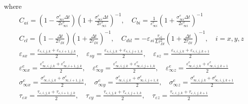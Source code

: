 \documentclass[pdftex,a4paper,parskip,listof=totoc,bibliography=totoc,onehalfspacing,12pt]{scrreprt}
\begin{document}
where
\begin{align*}
  &C_{ai} = \left( 1 - \frac{\sigma^e_{\infty i} \Delta t}{2 \varepsilon^e_{\infty i}} \right) \left( 1 + \frac{\sigma^e_{\infty i} \Delta t}{2 \varepsilon^e_{\infty i}} \right)^{-1}, \quad
  C_{bi} = \frac{1}{\varepsilon^e_{\infty i}} \left( 1 + \frac{\sigma^e_{\infty i} \Delta t}{2 \varepsilon^e_{\infty i}} \right)^{-1}\\
  &C_{c l} = \left( 1 - \frac{ \Delta t}{2 \tau_{Dl}} \right) \left( 1 + \frac{ \Delta t}{2 \tau_{Dl}} \right)^{-1}, \quad
  C_{d i l} = -\varepsilon_{s i} \frac{\tau_{\varepsilon i}}{L \tau_{Dl}^2} \left( 1 + \frac{ \Delta t}{2 \tau_{Dl}} \right)^{-1}, \quad  i = x,y,z\\
  &\varepsilon_{s x} = \frac{\varepsilon_{s, i,j,k} + \varepsilon_{s, i+1,j,k}}{2}, \quad
  \varepsilon_{s y} = \frac{\varepsilon_{s, i,j,k} + \varepsilon_{s, i,j+1,k}}{2}, \quad
  \varepsilon_{s z} = \frac{\varepsilon_{s, i,j,k} + \varepsilon_{s, i,j,k+1}}{2} \\
  &\varepsilon^e_{\infty x} = \frac{\varepsilon^e_{\infty, i,j,k} + \varepsilon^e_{\infty, i+1,j,k}}{2}, \quad
  \varepsilon^e_{\infty y} = \frac{\varepsilon^e_{\infty, i,j,k} + \varepsilon^e_{\infty, i,j+1,k}}{2}, \quad
  \varepsilon^e_{\infty z} = \frac{\varepsilon^e_{\infty, i,j,k} + \varepsilon^e_{\infty, i,j,k+1}}{2} \\
  &\sigma^e_{\infty x} = \frac{\sigma^e_{\infty ,i,j,k} + \sigma^e_{\infty ,i+1,j,k}}{2}, \quad
  \sigma^e_{\infty y} = \frac{\sigma^e_{\infty ,i,j,k} + \sigma^e_{\infty ,i,j+1,k}}{2}, \quad
  \sigma^e_{\infty z} = \frac{\sigma^e_{\infty ,i,j,k} + \sigma^e_{\infty ,i,j,k+1}}{2} \\
  &\tau_{\varepsilon x} = \frac{\tau_{\varepsilon ,i,j,k} + \tau_{\varepsilon ,i+1,j,k}}{2}, \quad
  \tau_{\varepsilon y} = \frac{\tau_{\varepsilon ,i,j,k} + \tau_{\varepsilon ,i,j+1,k}}{2}, \quad
  \tau_{\varepsilon z} = \frac{\tau_{\varepsilon ,i,j,k} + \tau_{\varepsilon ,i,j,k+1}}{2} 
\end{align*}
\end{document}
